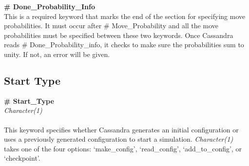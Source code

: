 %
{\bf \# Done\_Probability\_Info} \\
This is a required keyword that marks the end of the section for specifying move probabilities. It must occur after \# Move\_Probability and all the move probabilities must be specified between these two keywords. Once Cassandra reads \# Done\_Probability\_info, it checks to make sure the probabilities sum to unity. If not, an error will be given.
%
%
%
\subsection{Start Type}\label{sec:Start_Type}
{\bf \# Start\_Type} \\
{\it Character(1) } \\ \\
%
This keyword specifies whether Cassandra generates an initial configuration or uses a previously generated configuration
to start a simulation. {\it Character(1)} takes one of the four options: `make\_config', `read\_config', `add\_to\_config', or `checkpoint'.
%
